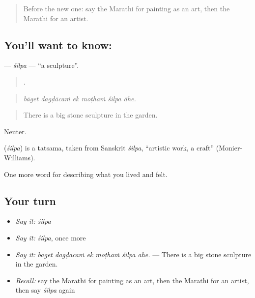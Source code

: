 \label{lesson:MR-C535-silpa}



\begin{quote}
Before the new one: say the Marathi for painting as an art, then the Marathi for an artist.
\end{quote}

\subsection*{You'll want to know: }
\textbf{} — \emph{śilpa} — \textquotedblleft{}a sculpture\textquotedblright{}.

\begin{quote}
     .
\end{quote}

\begin{quote}
\emph{bāget dagḍācaṁ ek moṭhaṁ śilpa āhe.}
\end{quote}

\begin{quote}
There is a big stone sculpture in the garden.
\end{quote}

Neuter.

\begin{cousinweb}
\textbf{} (\emph{śilpa}) is a tatsama, taken from Sanskrit \emph{śilpa}, \textquotedblleft{}artistic work, a craft\textquotedblright{} (Monier-Williams).
\end{cousinweb}

\begin{grammarlens}[title={What you've built}]
One more word for describing what you lived and felt.
\end{grammarlens}

\subsection*{Your turn}
\begin{itemize}
\raggedright
  \item \emph{Say it:} \emph{śilpa}
  \item \emph{Say it:} \emph{śilpa}, once more
  \item \emph{Say it:} \emph{bāget dagḍācaṁ ek moṭhaṁ śilpa āhe.} — There is a big stone sculpture in the garden.
  \item \emph{Recall:} say the Marathi for painting as an art, then the Marathi for an artist, then say \emph{śilpa} again
\end{itemize}


